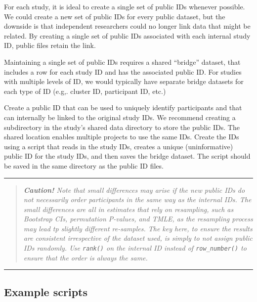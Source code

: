 \documentclass[
]{book}
\begin{document}
For each study, it is ideal to create a single set of public IDs whenever possible. We could create a new set of public IDs for every public dataset, but the downside is that independent researchers could no longer link data that might be related. By creating a single set of public IDs associated with each internal study ID, public files retain the link.

Maintaining a single set of public IDs requires a shared ``bridge'' dataset, that includes a row for each study ID and has the associated public ID. For studies with multiple levels of ID, we would typically have separate bridge datasets for each type of ID (e.g,. cluster ID, participant ID, etc.)

Create a public ID that can be used to uniquely identify participants and that can internally be linked to the original study IDs. We recommend creating a subdirectory in the study's shared data directory to store the public IDs. The shared location enables multiple projects to use the same IDs. Create the IDs using a script that reads in the study IDs, creates a unique (uninformative) public ID for the study IDs, and then saves the bridge dataset. The script should be saved in the same directory as the public ID files.

\begin{center}\rule{0.5\linewidth}{0.5pt}\end{center}

\begin{quote}
\emph{\textbf{Caution!} Note that small differences may arise if the new public IDs do not necessarily order participants in the same way as the internal IDs. The small differences are all in estimates that rely on resampling, such as Bootstrap CIs, permutation P-values, and TMLE, as the resampling process may lead tp slightly different re-samples. The key here, to ensure the results are consistent irrespective of the dataset used, is simply to not assign public IDs randomly. Use \texttt{rank()} on the internal ID instead of \texttt{row\_number()} to ensure that the order is always the same. }
\end{quote}

\begin{center}\rule{0.5\linewidth}{0.5pt}\end{center}

\subsection{Example scripts}\label{example-scripts}
\end{document}
